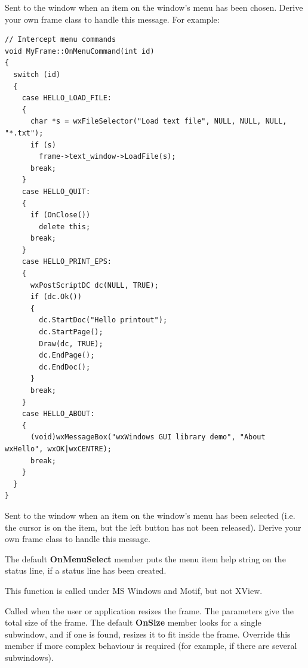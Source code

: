\label{wxframeonmenucommand}


Sent to the window when an item on the window's menu has been chosen.
Derive your own frame class to handle this message. For example:

\begin{verbatim}
// Intercept menu commands
void MyFrame::OnMenuCommand(int id)
{
  switch (id)
  {
    case HELLO_LOAD_FILE:
    {
      char *s = wxFileSelector("Load text file", NULL, NULL, NULL, "*.txt");
      if (s)
        frame->text_window->LoadFile(s);
      break;
    }
    case HELLO_QUIT:
    {
      if (OnClose())
        delete this;
      break;
    }
    case HELLO_PRINT_EPS:
    {
      wxPostScriptDC dc(NULL, TRUE);
      if (dc.Ok())
      {
        dc.StartDoc("Hello printout");
        dc.StartPage();
        Draw(dc, TRUE);
        dc.EndPage();
        dc.EndDoc();
      }
      break;
    }
    case HELLO_ABOUT:
    {
      (void)wxMessageBox("wxWindows GUI library demo", "About wxHello", wxOK|wxCENTRE);
      break;
    }
  }
}
\end{verbatim}

\label{wxframeonmenuselect}


Sent to the window when an item on the window's menu has been selected
(i.e. the cursor is on the item, but the left button has not been
released). Derive your own frame class to handle this message.

The default {\bf OnMenuSelect} member puts the menu item help string
on the status line, if a status line has been created.

This function is called under MS Windows and Motif, but not XView.

\label{wxframeonsize}


Called when the user or application resizes the frame. The parameters
give the total size of the frame. The default {\bf OnSize} member
looks for a single subwindow, and if one is found, resizes it to fit
inside the frame. Override this member if more complex behaviour
is required (for example, if there are several subwindows).


